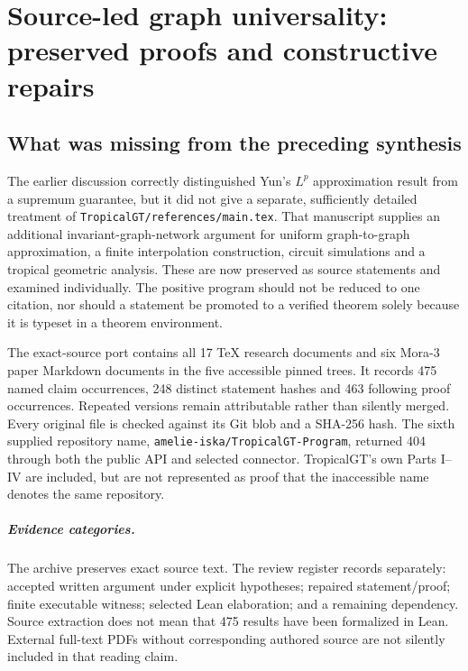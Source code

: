\chapter{Source-led graph universality: preserved proofs and constructive repairs}
\label{ch:source-led-repair}

\section{What was missing from the preceding synthesis}

The earlier discussion correctly distinguished Yun's $L^p$ approximation result from a supremum guarantee, but it did not give a separate, sufficiently detailed treatment of \texttt{TropicalGT/references/main.tex}. That manuscript supplies an additional invariant-graph-network argument for uniform graph-to-graph approximation, a finite interpolation construction, circuit simulations and a tropical geometric analysis. These are now preserved as source statements and examined individually. The positive program should not be reduced to one citation, nor should a statement be promoted to a verified theorem solely because it is typeset in a theorem environment.

The exact-source port contains all 17 TeX research documents and six Mora-3 paper Markdown documents in the five accessible pinned trees. It records 475 named claim occurrences, 248 distinct statement hashes and 463 following proof occurrences. Repeated versions remain attributable rather than silently merged. Every original file is checked against its Git blob and a SHA-256 hash. The sixth supplied repository name, \texttt{amelie-iska/TropicalGT-Program}, returned 404 through both the public API and selected connector. TropicalGT's own Parts I--IV are included, but are not represented as proof that the inaccessible name denotes the same repository.

\paragraph{Evidence categories.} The archive preserves exact source text. The review register records separately: accepted written argument under explicit hypotheses; repaired statement/proof; finite executable witness; selected Lean elaboration; and a remaining dependency. Source extraction does not mean that 475 results have been formalized in Lean. External full-text PDFs without corresponding authored source are not silently included in that reading claim.

